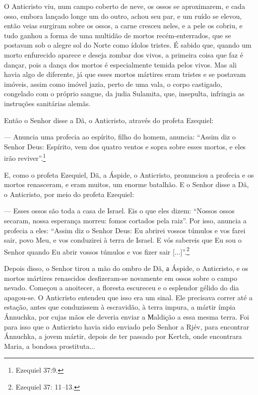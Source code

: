 O Anticristo viu, num campo coberto de neve, os ossos se aproximarem, e
cada osso, embora lançado longe um do outro, achou seu par, e um ruído
se elevou, então veias surgiram sobre os ossos, a carne cresceu neles, e
a pele os cobriu, e tudo ganhou a forma de uma multidão de mortos
recém-enterrados, que se postavam sob o alegre sol do Norte como ídolos
tristes. É sabido que, quando um morto enfurecido aparece e deseja
zombar dos vivos, a primeira coisa que faz é dançar, pois a dança dos
mortos é especialmente temida pelos vivos. Mas ali havia algo de
diferente, já que esses mortos mártires eram tristes e se postavam
imóveis, assim como imóvel jazia, perto de uma vala, o corpo castigado,
congelado com o próprio sangue, da judia Sulamita, que, insepulta,
infringia as instruções sanitárias alemãs.

Então o Senhor disse a Dã, o Anticristo, através do profeta Ezequiel:

--- Anuncia uma profecia ao espírito, filho do homem, anuncia: ``Assim
diz o Senhor Deus: Espírito, vem dos quatro ventos e sopra sobre esses
mortos, e eles irão reviver''.\footnote{Ezequiel 37:9.}

E, como o profeta Ezequiel, Dã, a Áspide, o Anticristo, pronunciou a
profecia e os mortos renasceram, e eram muitos, um enorme batalhão. E o
Senhor disse a Dã, o Anticristo, por meio do profeta Ezequiel:

--- Esses ossos são toda a casa de Israel. Eis o que eles dizem:
``Nossos ossos secaram, nossa esperança morreu: fomos cortados pela
raiz''. Por isso, anuncia a profecia a eles: ``Assim diz o Senhor Deus:
Eu abrirei vossos túmulos e vos farei sair, povo Meu, e vos conduzirei à
terra de Israel. E vós sabereis que Eu sou o Senhor quando Eu abrir
vossos túmulos e vos fizer sair {[}...{]}''.\footnote{Ezequiel 37:
  11\emph{--}13.}

Depois disso, o Senhor tirou a mão do ombro de Dã, а Áspide, o
Anticristo, e os mortos mártires renascidos desfizeram-se novamente em
ossos sobre o campo nevado. Começou a anoitecer, a floresta escureceu e
o esplendor gélido do dia apagou-se. O Anticristo entendeu que isso era
um sinal. Ele precisava correr até a estação, antes que conduzissem à
escravidão, à terra impura, a mártir ímpia Ánnuchka, por cujas mãos ele
deveria enviar a Мaldição a essa mesma terra. Foi para isso que o
Anticristo havia sido enviado pelo Senhor a Rjév, para encontrar
Ánnuchka, a jovem mártir, depois de ter passado por Kertch, onde
encontrara Maria, a bondosa prostituta...

